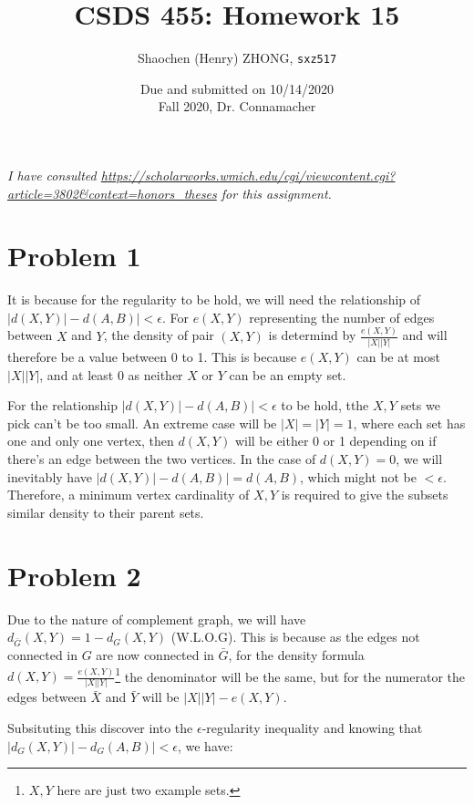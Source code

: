 \documentclass[11pt]{article}
\newcommand{\ilc}{\texttt}
\begin{document}
\title{\textbf{CSDS 455: Homework 15}}

\author{Shaochen (Henry) ZHONG, \ilc{sxz517}}
\date{Due and submitted on 10/14/2020 \\ Fall 2020, Dr. Connamacher}
\maketitle

\textit{I have consulted \url{https://scholarworks.wmich.edu/cgi/viewcontent.cgi?article=3802&context=honors_theses} for this assignment.}

\section*{Problem 1}

It is because for the regularity to be hold, we will need the relationship of $|d(X, Y)| - d(A, B)| < \epsilon$. For $e(X, Y)$ representing the number of edges between $X$ and $Y$, the density of pair $(X, Y)$ is determind by $\frac{e(X, Y)}{|X||Y|}$ and will therefore be a value between 0 to 1. This is because $e(X, Y)$ can be at most $|X||Y|$, and at least $0$ as neither $X$ or $Y$ can be an empty set.

For the relationship $|d(X, Y)| - d(A, B)| < \epsilon$ to be hold, tthe $X, Y$ sets we pick can't be too small. An extreme case will be $|X| = |Y| = 1$, where each set has one and only one vertex, then $d(X, Y)$ will be either 0 or 1 depending on if there's an edge between the two vertices. In the case of $d(X, Y) = 0$, we will inevitably have $|d(X, Y)| - d(A, B)| = d(A, B)$, which might not be $< \epsilon$. Therefore, a minimum vertex cardinality of $X, Y$ is required to give the subsets similar density to their parent sets.


\section*{Problem 2}

Due to the nature of complement graph, we will have $d_{\bar{G}}(X, Y) = 1 - d_G(X, Y)$ (W.L.O.G). This is because as the edges not connected in $G$ are now connected in $\bar{G}$, for the density formula $d(X, Y) = \frac{e(X, Y)}{|X||Y|}$\footnote{$X, Y$ here are just two example sets.} the denominator will be the same, but for the numerator the edges between $\bar{X}$ and $\bar{Y}$ will be $|X||Y| - e(X, Y)$.

Subsituting this discover into the $\epsilon$-regularity inequality and knowing that $|d_G(X, Y)| - d_G(A, B)| < \epsilon$, we have:
\end{document}
